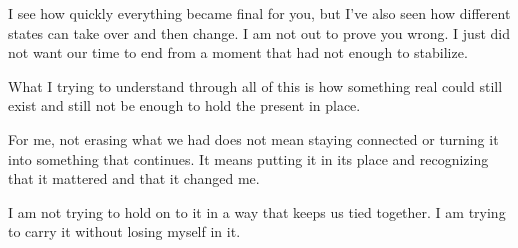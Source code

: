 \documentclass[10pt,twocolumn]{article}
\begin{document}
I see how quickly everything became final for you, but I've also seen how different states can take over and then change. I am not out to prove you wrong. I just did not want our time to end from a moment that had not enough to stabilize.

What I trying to understand through all of this is how something real could still exist and still not be enough to hold the present in place.

For me, not erasing what we had does not mean staying connected or turning it into something that continues. It means putting it in its place and recognizing that it mattered and that it changed me.

I am not trying to hold on to it in a way that keeps us tied together. I am trying to carry it without losing myself in it.
\end{document}
